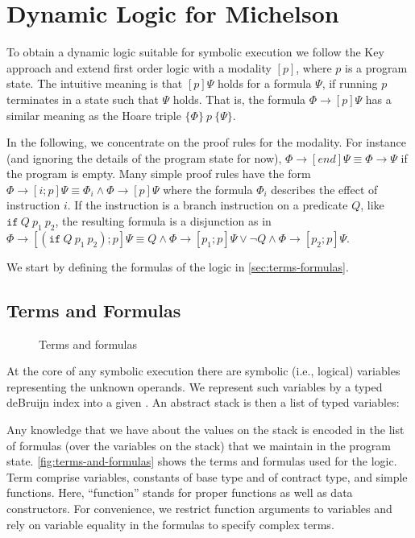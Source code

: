 \section{Dynamic Logic for Michelson}
\label{sec:DL}

To obtain a dynamic logic suitable for symbolic execution we follow
the Key approach \cite{KeY3} and extend
first order logic with a modality $[p]$, where $p$ is a program state. The
intuitive meaning is that $[p]\Psi$ holds for a formula $\Psi$, if
running $p$ terminates in a state such that $\Psi$ holds. That is, the
formula $\Phi \to [p]\Psi$ has a similar meaning as the Hoare triple
$\{\Phi\}~p~\{ \Psi\}$.

In the following, we concentrate on the proof rules for the
modality. For instance (and ignoring the details of the program state
for now), $\Phi \to [end]\Psi \equiv \Phi \to \Psi$ if the program is
empty. Many simple proof rules have the form $\Phi \to [i; p]\Psi \equiv \Phi_i
\wedge\Phi \to  [p]\Psi$ where the formula $\Phi_i$ describes the effect of
instruction $i$. If the instruction is a branch instruction on a
predicate $Q$, like $\mathtt{if}~Q~p_1~p_2$, the resulting formula is a
disjunction as in $\Phi \to [(\mathtt{if}~Q~p_1~p_2); p]\Psi \equiv Q
\wedge \Phi \to [p_1; p]\Psi \vee \neg Q \wedge \Phi \to  [p_2; p]\Psi$.

We start by defining the formulas of the logic in \autoref{sec:terms-formulas}.

\subsection{Terms and Formulas}\label{sec:terms-formulas}
\begin{figure}[tp]
  \AbstractTerm
  \AbstractFormula
  \caption{Terms and formulas}
  \label{fig:terms-and-formulas}
\end{figure}

At the core of any symbolic execution there are symbolic (i.e., logical) variables
representing the unknown operands.
We represent such variables by a typed deBruijn index into a given
{\AbstractContext}.
An abstract stack is then a list of typed variables:
\AbstractMatch

Any knowledge that we have about the values on the stack is encoded in
the list of formulas (over the variables on the stack) that we
maintain in the program state.
\autoref{fig:terms-and-formulas} shows the terms and formulas used for the logic.
Term comprise variables, constants of base type and of contract type,
and simple functions. Here, ``function'' stands for proper functions as
well as data constructors. For convenience, we restrict function arguments
to variables and rely on variable equality in the formulas to specify
complex terms.

